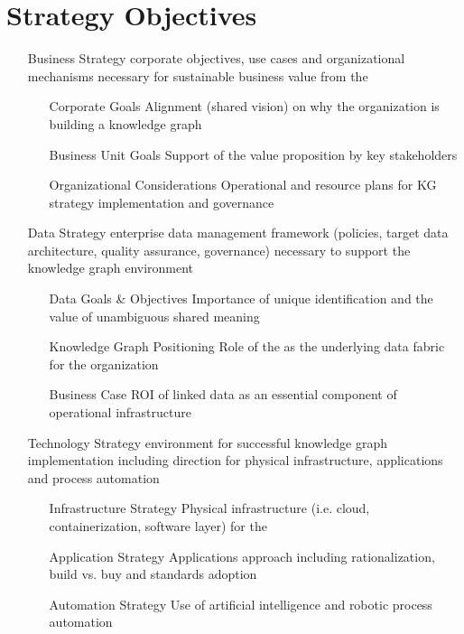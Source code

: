 \chapter{Strategy Objectives}
%
%
\begin{itemize}[leftmargin=2in,font=\bfseries]
  \item [Business Strategy] corporate objectives, use cases and organizational mechanisms necessary for sustainable business value from the 
  \begin{itemize}[labelwidth=1.5in,leftmargin=0in]
    \item [Corporate Goals] Alignment (shared vision) on why the organization is building a knowledge graph
    \item [Business Unit Goals] Support of the  value proposition by key  stakeholders
    \item [Organizational Considerations] Operational and resource plans for KG strategy implementation and governance
  \end{itemize}
  \item [Data Strategy] enterprise data management framework (policies, target data architecture, quality assurance, governance) necessary to support the knowledge graph environment
    \begin{itemize}[labelwidth=1.5in,leftmargin=0in]
      \item [Data Goals \& Objectives] Importance of unique identification and the value of unambiguous shared meaning
      \item [Knowledge Graph Positioning] Role of the  as the underlying data fabric for the organization
      \item [Business Case] ROI of linked data as an essential component of operational infrastructure
    \end{itemize}
  \item [Technology Strategy] environment for successful knowledge graph implementation including direction for physical infrastructure, applications and process automation
    \begin{itemize}[labelwidth=1.5in,leftmargin=0in]
      \item [Infrastructure Strategy] Physical infrastructure (i.e. cloud, containerization, software layer) for the 
      \item [Application Strategy] Applications approach including rationalization, build vs. buy and standards adoption
      \item [Automation Strategy] Use of artificial intelligence and robotic process automation
    \end{itemize}
\end{itemize}

